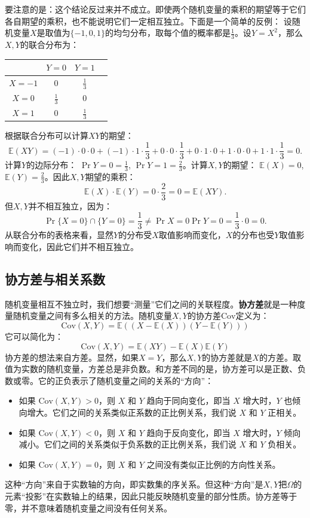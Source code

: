 \documentclass[12pt,UTF8,fontset=none]{ctexbook}
\begin{document}
要注意的是：这个结论反过来并不成立。即使两个随机变量的乘积的期望等于它们各自期望的乘积，也不能说明它们一定相互独立。下面是一个简单的反例：
设随机变量$X$是取值为$\{-1,0,1\}$的均匀分布，取每个值的概率都是$\displaystyle \frac{1}{3}$。设$Y=X^2$，那么$X,Y$的联合分布为：
\begin{center}
\begin{tabular}{c|ccc}
 & \(Y=0\) & \(Y=1\) \\ \hline
\(X=-1\) & 0 & \(\frac{1}{3}\)  \\
\(X=0\) & \(\frac{1}{3}\) & 0 \\
\(X=1\) & 0 & \(\frac{1}{3}\)
\end{tabular}
\end{center}
根据联合分布可以计算$XY$的期望：
\[\mathbb{E}(XY) = (-1)\cdot0\cdot0 + (-1)\cdot1\cdot\frac{1}{3} + 0\cdot0\cdot\frac{1}{3} + 0\cdot 1\cdot 0 + 1\cdot 0\cdot 0 + 1\cdot1\cdot\frac{1}{3} = 0.\]
计算$Y$的边际分布：
\(\Pr{Y=0} = \frac{1}{3}\), \(\Pr{Y=1} = \frac{2}{3}\)。计算$X,Y$的期望：
\(\mathbb{E}(X) = 0\), \(\mathbb{E}(Y) = \frac{2}{3}\)。因此$X,Y$期望的乘积：
\[\mathbb{E}(X) \cdot \mathbb{E}(Y) = 0 \cdot \frac{2}{3} = 0 = \mathbb{E}(XY).\]
但$X,Y$并不相互独立，因为：
\[\Pr{\{X=0\}\cap\{Y=0\}} = \frac{1}{3} \neq \Pr{X=0}\Pr{Y=0} = \frac{1}{3} \cdot 0 = 0.
\]
从联合分布的表格来看，显然$Y$的分布受$X$取值影响而变化，$X$的分布也受$Y$取值影响而变化，因此它们并不相互独立。

\subsection{协方差与相关系数}

随机变量相互不独立时，我们想要“测量”它们之间的关联程度。\textbf{协方差}就是一种度量随机变量之间有多么相关的方法。随机变量$X,Y$的协方差$\text{Cov}$定义为：
\[
\text{Cov}(X,Y) = \mathbb{E}((X - \mathbb{E}(X))(Y - \mathbb{E}(Y)))
\]
它可以简化为：
\[
\text{Cov}(X,Y) = \mathbb{E}(XY) - \mathbb{E}(X)\mathbb{E}(Y)
\]
协方差的想法来自方差。显然，如果$X=Y$，那么$X,Y$的协方差就是$X$的方差。取值为实数的随机变量，方差总是非负数。和方差不同的是，协方差可以是正数、负数或零。它的正负表示了随机变量之间的关系的“方向”：
\begin{itemize}
    \item 如果 \(\text{Cov}(X,Y) > 0\)，则 \(X\) 和 \(Y\) 趋向于同向变化，即当 \(X\) 增大时，\(Y\) 也倾向增大。它们之间的关系类似正系数的正比例关系，我们说 \(X\) 和 \(Y\) 正相关。
    \item 如果 \(\text{Cov}(X,Y) < 0\)，则 \(X\) 和 \(Y\) 趋向于反向变化，即当 \(X\) 增大时，\(Y\) 倾向减小。它们之间的关系类似于负系数的正比例关系，我们说 \(X\) 和 \(Y\) 负相关。
    \item 如果 \(\text{Cov}(X,Y) = 0\)，则 \(X\) 和 \(Y\) 之间没有类似正比例的方向性关系。
\end{itemize}
这种“方向”来自于实数轴的方向，即实数集的序关系。但这种“方向”是$X,Y$把$\Omega$的元素“投影”在实数轴上的结果，因此只能反映随机变量的部分性质。协方差等于零，并不意味着随机变量之间没有任何关系。
\end{document}

